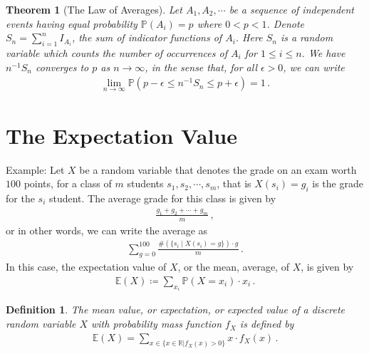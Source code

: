 \documentclass[11pt, onesided]{book}
\theoremstyle{break}
\theoremstyle{break}
\newtheorem{thm}{Theorem}[section]
\newtheorem{defn}{Definition}[thm]
\newcommand{\R}{\mathbb{R}}
\newcommand{\example}{\color{green}Example: \color{black}}
\begin{document}
\begin{thm}[The Law of Averages]
Let $A_1,A_2,\cdots$ be a sequence of independent events having equal probability $\mathbb{P}(A_i) = p$ where $0 < p <1$. Denote $S_n = \sum_{i=1}^n I_{A_i}$, the sum of indicator functions of $A_i$. Here $S_n$ is a random variable which counts the number of occurrences of $A_i$ for $1\leq i \leq n$. We have $n^{-1}S_n$ converges to $p$ as $n\to \infty$, in the sense that, for all $\epsilon>0$, we can write
\begin{align*}
\lim_{n \to \infty}\mathbb{P}(p-\epsilon \leq n^{-1}S_n \leq p+\epsilon) =1\,.
\end{align*} 
\end{thm}



\section[The Expectation Value]{\color{red}The Expectation Value\color{black}}
\example Let $X$ be a random variable that denotes the grade on an exam worth $100$ points, for a class of $m$ students $s_1,s_2,\cdots, s_m$, that is $X(s_i) = g_i$ is the grade for the $s_i$ student. The average grade for this class is given by
\begin{align*}
\frac{g_1 + g_2 + \cdots + g_m}{m}\,,
\end{align*}
or in other words, we can write the average as
\begin{align*}
\sum_{g=0}^{100} \frac{\#(\{s_i \mid X(s_i) = g\}) \cdot g}{m}\,.
\end{align*}
In this case, the expectation value of $X$, or the mean, average, of $X$, is given by
\begin{align*}
\mathbb{E}(X) \coloneqq \sum_{x_i} \mathbb{P}(X = x_i)\cdot x_i\,.
\end{align*}

\begin{defn}
The mean value, or expectation, or expected value of a discrete random variable $X$ with probability mass function $f_X$ is defined by
\begin{align*}
\mathbb{E}(X) = \sum_{x \in \{x\in \R | f_X(x) >0\}} x\cdot f_X(x) \,.
\end{align*}
\end{defn}
\end{document}
